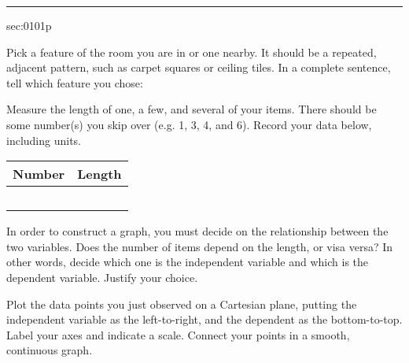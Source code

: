 \renewcommand{\columnseprule}{1.5pt}
\begin{multicols*}{2}
\rule[0.5\baselineskip]{0.4\textwidth}{1pt}
\noindent
{}\label{sec:0101p}
\begin{exercises}{sec:0101p}

\lab[0101LabPick] Pick a feature of the room you are in or one nearby.  It should be a repeated, adjacent pattern,
such as carpet squares or ceiling tiles.  In a complete sentence, tell which feature you chose:

\vspace{2cm}
\lab[0101LabMeasure] Measure the length of one, a few, and several of your items.  There should be some number(s) you
skip over (e.g. 1, 3, 4, and 6).  Record your data below, including units.

\begin{center}%
\begin{tabular}{ c | p{3cm}  }
  \textbf{Number} & \textbf{Length} \\ 
  \hline \hline 
  &  \\ 
  \hline
  &  \\ 
  \hline
  &  \\ 
  \hline
  &  \\ 
  \hline
  &  \\ 
  \hline
\end{tabular}%
\end{center}%
\lab[0101LabVar] In order to construct a graph, you must
decide on the relationship between the two variables.  Does the number of items depend on
the length, or visa versa?  In other words, decide which one is the \gls{independent variable} and which
is the \gls{dependent variable}.  Justify your choice.

\vspace{2cm}
\lab[0101LabPlot] Plot the data points you just observed on a \gls{Cartesian plane}, putting
the independent variable as the left-to-right, and the dependent as the bottom-to-top.
Label your axes and indicate a scale.
Connect your points in a smooth, continuous graph.

\noindent
{}

\vspace{1cm}


\end{exercises}
\end{multicols*}
